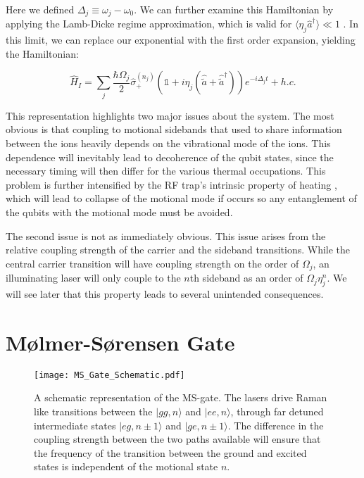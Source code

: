 \documentclass[12pt,twoside]{report}
\begin{document}
Here we defined $\Delta_j\equiv\omega_j-\omega_0$. We can further examine this Hamiltonian by applying the Lamb-Dicke regime approximation, which is valid for $\langle\eta_j\hat{a}^\dagger\rangle \ll 1$ \cite{MS_gate}. In this limit, we can replace our exponential with the first order expansion, yielding the Hamiltonian:

\begin{equation}
	\hat{H}_I = \sum_{j}\frac{\hbar\Omega_j}{2}\hat{\sigma}^{\left(n_j\right)}_+\left(\mathds{1} + i\eta_j\left(\hat{\tilde{a}} + \hat{\tilde{a}}^\dagger\right)\right)e^{-i\Delta_jt} + h.c.
	\label{eq:Interaction_H_LD}
\end{equation}

This representation highlights two major issues about the system. The most obvious is that coupling to motional sidebands that used to share information between the ions \cite{QIP_Trapped_ions} heavily depends on the vibrational mode of the ions. This dependence will inevitably lead to decoherence of the qubit states, since the necessary timing will then differ for the various thermal occupations. This problem is further intensified by the RF trap's intrinsic property of heating \cite{QIP_Trapped_ions,RF_Traps}, which will lead to collapse of the motional mode if occurs so any entanglement of the qubits with the motional mode must be avoided.

The second issue is not as immediately obvious. This issue arises from the relative coupling strength of the carrier and the sideband transitions. While the central carrier transition will have coupling strength on the order of $\Omega_j$, an illuminating laser will only couple to the  $n$th sideband as an order of $\Omega_j\eta_j^n$. We will see later that this property leads to several unintended consequences.

\section{M\o lmer-S\o rensen Gate}
\label{Background:MS_gate}

\begin{figure}[t!]
	\centering
	\texttt{[image: MS\_Gate\_Schematic.pdf]}
	\caption[MS-gate schematic representation]{A schematic representation of the MS-gate. The lasers drive Raman like transitions between the $|gg,n\rangle$ and $|ee,n\rangle$, through far detuned intermediate states $|eg,n\pm 1\rangle$ and $|ge,n\pm 1\rangle$. The difference in the coupling strength between the two paths available will ensure that the frequency of the transition between the ground and excited states is independent of the motional state $n$.}
	\label{fig:ms_gate_schematic}
\end{figure}
\end{document}
